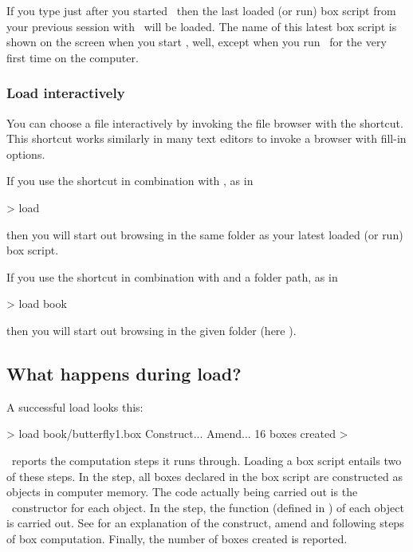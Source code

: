 If you type  just after you started \US\ then the last loaded (or run) box script from your previous session with \US\ will be loaded. The name of this latest box script is shown on the screen when you start \US, well, except when you run \US\ for the very first time on the computer.

\subsubsection{Load interactively}
You can choose a file interactively by invoking the file browser with the  shortcut. This shortcut works similarly in many text editors to invoke a browser with fill-in options.

If you use the shortcut in combination with , as in
\begin{usdialog}
> load %
\end{usdialog}
\noindent then you will start out browsing in the same folder as your latest loaded (or run) box script.

If you use the shortcut in combination with  and a folder path, as in
\begin{usdialog}
> load book %
\end{usdialog}
\noindent then you will start out browsing in the given folder (here ).

\subsection{What happens during load?}
A successful load looks this:

\begin{usdialog}
> load book/butterfly1.box
Construct...
Amend...
16 boxes created
> 
\end{usdialog}

\US\ reports the computation steps it runs through. Loading a box script entails two of these steps. In the  step, all boxes declared in the box script are constructed as objects in computer memory. The code actually being carried out is the \CPP\ constructor for each object. In the  step, the  function (defined in \CPP) of each object is carried out. See  for an explanation of the construct, amend and following steps of box computation. Finally, the number of boxes created is reported.

